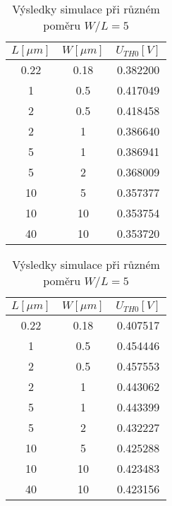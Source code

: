 \begin{table}[H]
    \begin{minipage}{0.5\textwidth}
        \centering
        \begin{tabular}{|c|c|c|}
            \hline
            \(L [\mu m]\) & \(W [\mu m]\) & \(U_{TH0} [V]\) \\ \hline
            0.22          & 0.18          & 0.382200        \\ \hline
            1	          & 0.5           & 0.417049	    \\ \hline
            2	          & 0.5           & 0.418458	    \\ \hline
            2	          & 1             & 0.386640        \\ \hline
            5             & 1             & 0.386941	    \\ \hline
            5  	          & 2             & 0.368009	    \\ \hline
            10 	          & 5             & 0.357377	    \\ \hline
            10 	          & 10            & 0.353754	    \\ \hline
            40 	          & 10            & 0.353720        \\ \hline
        \end{tabular}

        \vspace{5mm}
    \end{minipage}
    \hfill
    \begin{minipage}{0.5\textwidth}
        \centering
        \begin{tabular}{|c|c|c|}
            \hline
            \(L [\mu m]\) & \(W [\mu m]\) & \(U_{TH0} [V]\) \\ \hline
            0.22          & 0.18          & 0.407517        \\ \hline
            1	          & 0.5           & 0.454446        \\ \hline
            2	          & 0.5           & 0.457553        \\ \hline
            2	          & 1             & 0.443062        \\ \hline
            5             & 1             & 0.443399        \\ \hline
            5  	          & 2             & 0.432227        \\ \hline
            10 	          & 5             & 0.425288        \\ \hline
            10 	          & 10            & 0.423483        \\ \hline
            40 	          & 10            & 0.423156        \\ \hline
        \end{tabular}

        \vspace{5mm}
    \end{minipage}

    \caption{\label{tab:N_wl_const} Výsledky simulace při různém poměru \(W/L = 5\)}
\end{table}